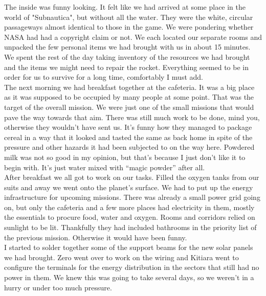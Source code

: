 \documentclass[a4paper,onecolumn,11pt]{article}
\begin{document}
\newline
The inside was funny looking. It felt like we had arrived at some place in the world of "Subnautica", but without all the water. They were the white, circular passageways almost identical to those in the game. We were pondering whether NASA had had a copyright claim or not. We each located our separate rooms and unpacked the few personal items we had brought with us in about 15 minutes. We spent the rest of the day taking inventory of the resources we had brought and the items we might need to repair the rocket. Everything seemed to be in order for us to survive for a long time, comfortably I must add.\\
\newline
The next morning we had breakfast together at the cafeteria. It was a big place as it was supposed to be occupied by many people at some point. That was the target of the overall mission. We were just one of the small missions that would pave the way towards that aim. There was still much work to be done, mind you, otherwise they wouldn't have sent us. It's funny how they managed to package cereal in a way that it looked and tasted the same as back home in spite of the pressure and other hazards it had been subjected to on the way here. Powdered milk was not so good in my opinion, but that's because I just don't like it to begin with. It's just water mixed with ``magic powder'' after all.\\
\newline
After breakfast we all got to work on our tasks. Filled the oxygen tanks from our suits and away we went onto the planet's surface. We had to put up the energy infrastructure for upcoming missions. There was already a small power grid going on, but only the cafeteria and a few more places had electricity in them, mostly the essentials to procure food, water and oxygen. Rooms and corridors relied on sunlight to be lit. Thankfully they had included bathrooms in the priority list of the previous mission. Otherwise it would have been funny.\\
\newline
I started to solder together some of the support beams for the new solar panels we had brought. Zero went over to work on the wiring and Kitiara went to configure the terminals for the energy distribution in the sectors that still had no power in them. We knew this was going to take several days, so we weren't in a hurry or under too much pressure.\\
\newline
\end{document}
